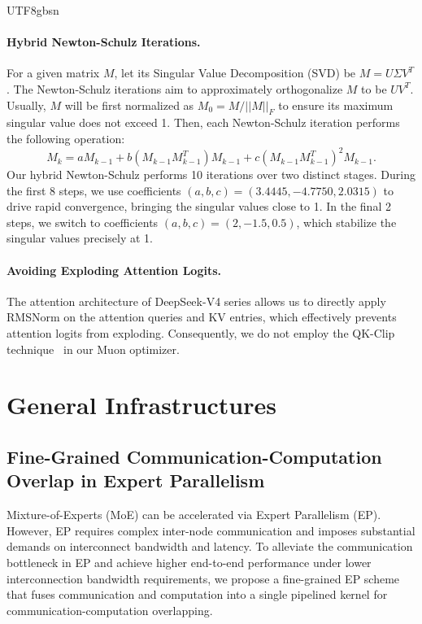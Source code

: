 \documentclass[11pt, a4paper, logo, copyright, nonumbering]{deepseek}
\newcommand{\dsviv}{DeepSeek-V4}
\begin{document}
\begin{CJK*}{UTF8}{gbsn}
\paragraph{Hybrid Newton-Schulz Iterations.}
For a given matrix $M$, let its Singular Value Decomposition (SVD) be $M = U \Sigma V^T$. 
The Newton-Schulz iterations aim to approximately orthogonalize $M$ to be $UV^T$.
Usually, $M$ will be first normalized as $M_0=M / ||M||_F$ to ensure its maximum singular value does not exceed 1. 
Then, each Newton-Schulz iteration performs the following operation:
\begin{equation}
    M_k = a M_{k-1} + b (M_{k-1} M_{k-1}^T) M_{k-1} + c (M_{k-1} M_{k-1}^T)^2 M_{k-1}.
\end{equation}
Our hybrid Newton-Schulz performs 10 iterations over two distinct stages. 
During the first 8 steps, we use coefficients $(a, b, c) = (3.4445, -4.7750, 2.0315)$ to drive rapid convergence, bringing the singular values close to 1. 
In the final 2 steps, we switch to coefficients $(a, b, c) = (2, -1.5, 0.5)$, which stabilize the singular values precisely at 1.

\paragraph{Avoiding Exploding Attention Logits.}
The attention architecture of \dsviv{} series allows us to directly apply RMSNorm on the attention queries and KV entries, which effectively prevents attention logits from exploding. 
Consequently, we do not employ the QK-Clip technique~\citep{muon_kimi} in our Muon optimizer. 

\section{General Infrastructures}
\label{sec:infra}

\subsection{Fine-Grained Communication-Computation Overlap in Expert Parallelism}
Mixture-of-Experts (MoE) can be accelerated via Expert Parallelism (EP).
However, EP requires complex inter-node communication and imposes substantial demands on interconnect bandwidth and latency.
To alleviate the communication bottleneck in EP and achieve higher end-to-end performance under lower interconnection bandwidth requirements, we propose a fine-grained EP scheme that fuses communication and computation into a single pipelined kernel for communication-computation overlapping.


\end{CJK*}
\end{document}
